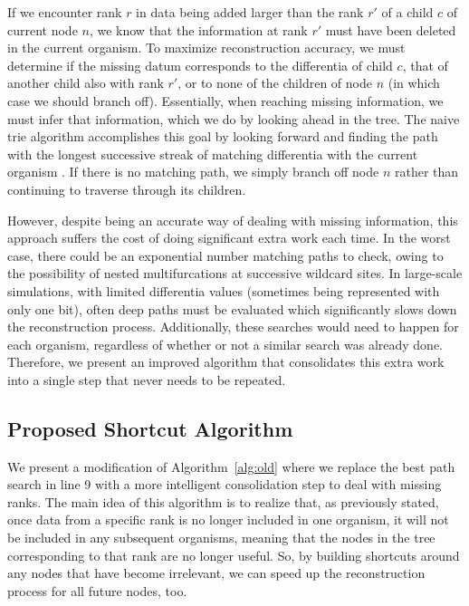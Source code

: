 If we encounter rank $r$ in data being added larger than the rank $r'$ of a child $c$ of current node $n$, we know that the information at rank $r'$ must have been deleted in the current organism.
To maximize reconstruction accuracy, we must determine if the missing datum corresponds to the differentia of child $c$, that of another child also with rank $r'$, or to none of the children of node $n$ (in which case we should branch off).
Essentially, when reaching missing information, we must infer that information, which we do by looking ahead in the tree.
The naive  trie algorithm accomplishes this goal by looking forward and finding the path with the longest successive streak of matching differentia with the current organism \citep{moreno2024analysis}.
If there is no matching path, we simply branch off node $n$ rather than continuing to traverse through its children.

However, despite being an accurate way of dealing with missing information, this approach suffers the cost of doing significant extra work each time.
In the worst case, there could be an exponential number matching paths to check, owing to the possibility of nested multifurcations at successive wildcard sites.
In large-scale simulations, with limited differentia values (sometimes being represented with only one bit), often deep paths must be evaluated which significantly slows down the reconstruction process.
Additionally, these searches would need to happen for each organism, regardless of whether or not a similar search was already done.
Therefore, we present an improved algorithm that consolidates this extra work into a single step that never needs to be repeated.

\subsection{Proposed Shortcut Algorithm} \label{sec:algorithm:shortcut}

We present a modification of Algorithm~\ref{alg:old} where we replace the best path search in line 9 with a more intelligent consolidation step to deal with missing ranks.
The main idea of this algorithm is to realize that, as previously stated, once data from a specific rank is no longer included in one organism, it will not be included in any subsequent organisms, meaning that the nodes in the tree corresponding to that rank are no longer useful.
So, by building shortcuts around any nodes that have become irrelevant, we can speed up the reconstruction process for all future nodes, too.


